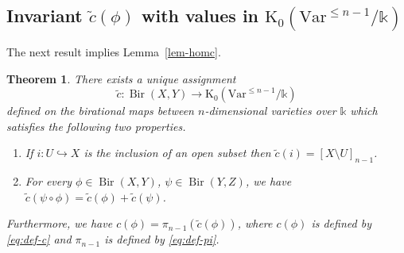 \documentclass[a4paper,12pt]{amsart}
\def\k{\mathbb k}
\def\Bir{{\operatorname{Bir}}}
\def\Kt{{\mathrm{K}}}
\def\Var{{\mathrm{Var}}}
\theoremstyle{plain}
\newtheorem{theorem}[dummy]{Theorem}
\numberwithin{equation}{section}
\theoremstyle{definition}
\newcommand{\ti}[1]{\tilde{#1}}
\renewcommand{\(}{\left(}
\renewcommand{\)}{\right)}
\newcommand{\hto}{\hookrightarrow}
\begin{document}
\subsection{Invariant $\ti{c}(\phi)$ with values in $\Kt_0(\Var^{\le n-1}/\k)$}\label{ssec-leftK}
\hfill

The next result implies Lemma~\ref{lem-homc}.

\begin{theorem}\label{thm-Defc}
There exists a unique assignment
\[
\ti{c}: \Bir(X,Y) \to \Kt_0(\Var^{\le{n-1}}/\k)
\]
defined on the birational maps 
between $n$-dimensional varieties over $\k$ which
satisfies the following two properties.
\begin{enumerate}
    \item If $i: U \hto X$ is the inclusion of an open subset
    then $\ti{c}(i) = [X \setminus U]_{n-1}$.
    \item For every $\phi \in \Bir(X, Y)$, $\psi \in \Bir(Y,Z)$,
    we have $\ti{c}(\psi \circ \phi) = \ti{c}(\phi) + \ti{c}(\psi)$.
\end{enumerate}
Furthermore, we have $c(\phi) = \pi_{n-1}(\ti{c}(\phi))$,
where $c(\phi)$ is defined by \eqref{eq:def-c} and
$\pi_{n-1}$ is defined by \eqref{eq:def-pi}.
\end{theorem}
\end{document}
